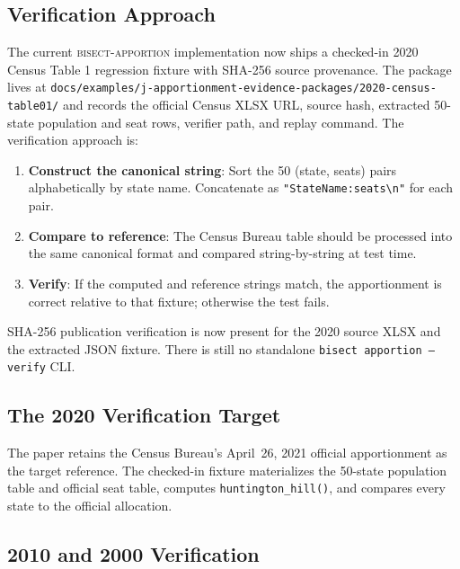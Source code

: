 \label{sec:verification}

\subsection{Verification Approach}

The current \textsc{bisect-apportion} implementation now ships a checked-in
2020 Census Table 1 regression fixture with SHA-256 source provenance.  The
package lives at
\texttt{docs/examples/j-apportionment-evidence-packages/2020-census-table01/}
and records the official Census XLSX URL, source hash, extracted 50-state
population and seat rows, verifier path, and replay command.  The verification
approach is:

\begin{enumerate}
  \item \textbf{Construct the canonical string}: Sort the 50 (state, seats)
    pairs alphabetically by state name.
    Concatenate as \texttt{"StateName:seats\textbackslash n"}
    for each pair.
  \item \textbf{Compare to reference}: The Census Bureau table
    \citep{census2020apportionment} should be processed into the same canonical
    format and compared string-by-string at test time.
  \item \textbf{Verify}: If the computed and reference strings match,
    the apportionment is correct relative to that fixture; otherwise the test fails.
\end{enumerate}

SHA-256 publication verification is now present for the 2020 source XLSX and
the extracted JSON fixture.  There is still no standalone \texttt{bisect
apportion --verify} CLI.

\subsection{The 2020 Verification Target}

The paper retains the Census Bureau's April~26, 2021 official apportionment
\citep{census2020apportionment} as the target reference.  The checked-in
fixture materializes the 50-state population table and official seat table,
computes \texttt{huntington\_hill()}, and compares every state to the official
allocation.

\subsection{2010 and 2000 Verification}

